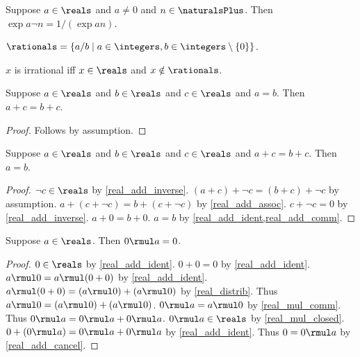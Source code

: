 \begin{axiom}\label{real_pow_neg}
    Suppose $a\in\reals$ and $a\neq 0$ and $n\in\naturalsPlus$.
    Then $\exp{a}{\neg{n}} = 1 / (\exp{a}{n})$. 
\end{axiom}

\begin{definition}\label{real_rationals}
    $\rationals = \{ a / b \mid a\in\integers, b\in\integers\setminus\{0\}\}$.
\end{definition}

\begin{abbreviation}\label{real_irrational}
    $x$ is irrational iff $x\in\reals$ and $x\notin\rationals$.
\end{abbreviation}

\begin{theorem}\label{real_add_eq_subst}
    Suppose $a\in\reals$ and $b\in\reals$ and $c\in\reals$ and $a = b$.
    Then $a + c = b + c$.
\end{theorem}
\begin{proof}
    Follows by assumption.
\end{proof}

\begin{theorem}\label{real_add_cancel}
    Suppose $a\in\reals$ and $b\in\reals$ and $c\in\reals$ and $a + c = b + c$.
    Then $a = b$.
\end{theorem}
\begin{proof}
    $\neg{c}\in\reals$ by \cref{real_add_inverse}.
    $(a + c) + \neg{c} = (b + c) + \neg{c}$ by assumption.
    $a + (c + \neg{c}) = b + (c + \neg{c})$ by \cref{real_add_assoc}.
    $c + \neg{c} = 0$ by \cref{real_add_inverse}.
    $a + 0 = b + 0$.
    $a = b$ by \cref{real_add_ident,real_add_comm}.
\end{proof}

\begin{theorem}\label{real_mul_zero}
    Suppose $a\in\reals$.
    Then $0 \rmul a = 0$.
\end{theorem}
\begin{proof}
    $0\in\reals$ by \cref{real_add_ident}.
    $0 + 0 = 0$ by \cref{real_add_ident}.
    $a \rmul 0 = a \rmul (0 + 0)$ by \cref{real_add_ident}.
    $a \rmul (0 + 0) = (a \rmul 0) + (a \rmul 0)$ by \cref{real_distrib}.
    Thus $a \rmul 0 = (a \rmul 0) + (a \rmul 0)$.
    $0 \rmul a = a \rmul 0$ by \cref{real_mul_comm}.
    Thus $0 \rmul a = 0 \rmul a + 0 \rmul a$.
    $0 \rmul a\in\reals$ by \cref{real_mul_closed}.
    $0 + (0 \rmul a) = 0 \rmul a + 0 \rmul a$ by \cref{real_add_ident}.
    Thus $0 = 0 \rmul a$ by \cref{real_add_cancel}.
\end{proof}

